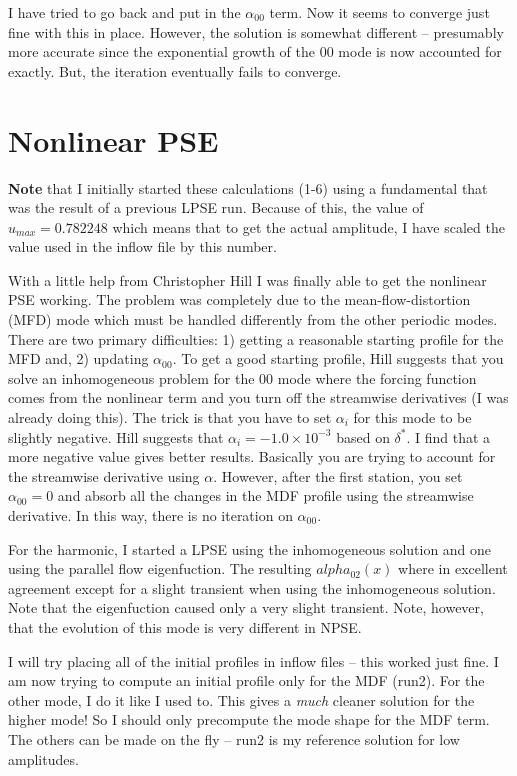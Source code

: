 \documentclass[12pt]{article}
\begin{document}
I have tried to go back and put in the $\alpha_{00}$ term.  Now it seems to
converge just fine with this in place.  However, the solution is somewhat
different -- presumably more accurate since the exponential growth of the 00
mode is now accounted for exactly.  But, the iteration eventually fails to
converge.

\section{Nonlinear PSE}

{\bf Note} that I initially started these calculations (1-6) using a
fundamental that was the result of a previous LPSE run.  Because of this, the
value of $u_{max} = 0.782248$ which means that to get the actual amplitude, I
have scaled the value used in the inflow file by this number.

With a little help from Christopher Hill I was finally able to get the
nonlinear PSE working.  The problem was completely due to the
mean-flow-distortion (MFD) mode which must be handled differently from the
other periodic modes.  There are two primary difficulties: 1) getting a
reasonable starting profile for the MFD and, 2) updating $\alpha_{00}$.  To
get a good starting profile, Hill suggests that you solve an inhomogeneous
problem for the 00 mode where the forcing function comes from the nonlinear
term and you turn off the streamwise derivatives (I was already doing this).
The trick is that you have to set $\alpha_i$ for this mode to be slightly
negative.  Hill suggests that $\alpha_i = -1.0\times10^{-3}$ based on
$\delta^*$.  I find that a more negative value gives better results.
Basically you are trying to account for the streamwise derivative using
$\alpha$.  However, after the first station, you set $\alpha_{00}=0$ and
absorb all the changes in the MDF profile using the streamwise derivative.  In
this way, there is no iteration on $\alpha_{00}$.

For the harmonic, I started a LPSE using the inhomogeneous solution and one
using the parallel flow eigenfuction.  The resulting $alpha_{02}(x)$ where in
excellent agreement except for a slight transient when using the inhomogeneous
solution.  Note that the eigenfuction caused only a very slight transient.
Note, however, that the evolution of this mode is very different in NPSE.

I will try placing all of the initial profiles in inflow files -- this worked
just fine.  I am now trying to compute an initial profile only for the MDF
(run2).  For the other mode, I do it like I used to.  This gives a {\em much}
cleaner solution for the higher mode!  So I should only precompute the mode
shape for the MDF term.  The others can be made on the fly -- run2 is my
reference solution for low amplitudes.
\end{document}
